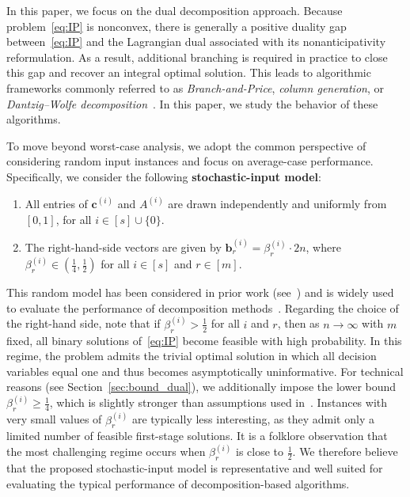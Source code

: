 \documentclass{article}
\newcommand{\cv}[0]{\mathbf{c}}
\newcommand{\bv}[0]{\mathbf{b}}
\begin{document}
In this paper, we focus on the dual decomposition approach.
Because problem~\eqref{eq:IP} is  nonconvex, there is generally a positive
duality gap between~\eqref{eq:IP} and the Lagrangian dual associated with its
nonanticipativity reformulation. %
As a result, additional branching is required in practice to close this gap and
recover an integral optimal solution.
This leads to algorithmic frameworks commonly referred to as
\emph{Branch-and-Price}, \emph{column generation}, or
\emph{Dantzig--Wolfe decomposition}~\cite{lubbecke2010column,desaulniers2006column}. In this paper, we study the behavior of these algorithms.

To move beyond worst-case analysis, we adopt the common perspective of considering random input instances and focus on average-case performance.
Specifically, we consider the following \textbf{stochastic-input model}:
\begin{enumerate}
    \item All entries of $\cv^{(i)}$ and $A^{(i)}$ are drawn independently and
    uniformly from $[0,1]$, for all $i \in [s] \cup \{0\}$.
    \item The right-hand-side vectors are given by
    $\bv^{(i)}_r = \beta^{(i)}_r \cdot 2n$, where
    $\beta^{(i)}_r \in (\tfrac{1}{4}, \tfrac{1}{2})$ for all
    $i \in [s]$ and $r \in [m]$.
\end{enumerate}

This random model has been considered in prior work (see~\cite{dyer1989probabilistic,dey2021branch}) and is widely
used to evaluate the performance of decomposition methods~\cite{angulo2016improving,bansal2024computational}.
Regarding the choice of the right-hand side, note that if
$\beta^{(i)}_r > \tfrac{1}{2}$ for all $i$ and $r$, then as $n \to \infty$ with $m$
fixed, all binary solutions of~\eqref{eq:IP} become feasible with high probability.
In this regime, the problem admits the trivial optimal solution in which all
decision variables equal one and thus becomes asymptotically uninformative.
For technical reasons (see Section~\ref{sec:bound_dual}), we additionally impose the lower
bound $\beta^{(i)}_r \ge \tfrac{1}{4}$, which is slightly stronger than assumptions
used in~\cite{dyer1989probabilistic}.
Instances with very small values of $\beta^{(i)}_r$ are typically less interesting,
as they admit only a limited number of feasible first-stage solutions.
It is a folklore observation that the most challenging regime occurs when
$\beta^{(i)}_r$ is close to $\tfrac{1}{2}$.
We therefore believe that the proposed stochastic-input model is representative
and well suited for evaluating the typical performance of decomposition-based
algorithms.
\end{document}
